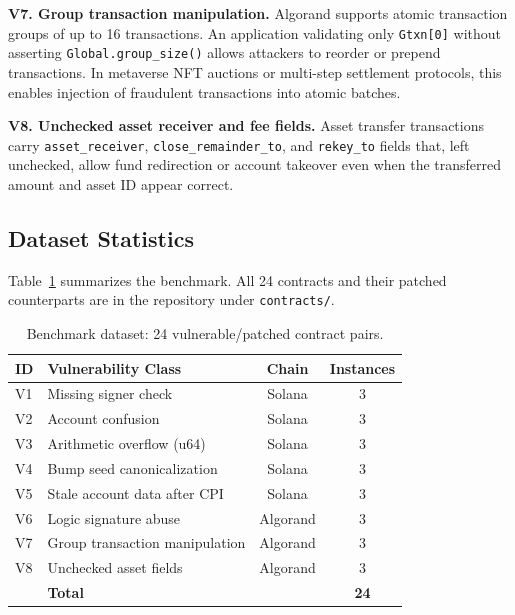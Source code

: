 \documentclass[runningheads]{llncs}
\begin{document}
\textbf{V7. Group transaction manipulation.}
Algorand supports atomic transaction groups of up to 16 transactions.
An application validating only \texttt{Gtxn[0]} without asserting
\texttt{Global.group\_size()} allows attackers to reorder or prepend
transactions.
In metaverse NFT auctions or multi-step settlement protocols, this enables
injection of fraudulent transactions into atomic batches.

\textbf{V8. Unchecked asset receiver and fee fields.}
Asset transfer transactions carry \texttt{asset\_receiver},
\texttt{close\_remainder\_to}, and \texttt{rekey\_to} fields that, left
unchecked, allow fund redirection or account takeover even when the transferred
amount and asset ID appear correct.

\subsection{Dataset Statistics}

Table~\ref{tab:dataset} summarizes the benchmark.
All 24 contracts and their patched counterparts are in the repository under
\texttt{contracts/}.

\begin{table}[t]
\caption{Benchmark dataset: 24 vulnerable/patched contract pairs.}
\label{tab:dataset}
\centering
\begin{tabular}{llcc}
\toprule
\textbf{ID} & \textbf{Vulnerability Class} & \textbf{Chain} & \textbf{Instances} \\
\midrule
V1 & Missing signer check          & Solana   & 3 \\
V2 & Account confusion             & Solana   & 3 \\
V3 & Arithmetic overflow (u64)     & Solana   & 3 \\
V4 & Bump seed canonicalization    & Solana   & 3 \\
V5 & Stale account data after CPI  & Solana   & 3 \\
V6 & Logic signature abuse         & Algorand & 3 \\
V7 & Group transaction manipulation& Algorand & 3 \\
V8 & Unchecked asset fields        & Algorand & 3 \\
\midrule
   & \textbf{Total}                &          & \textbf{24} \\
\bottomrule
\end{tabular}
\end{table}

\end{document}
